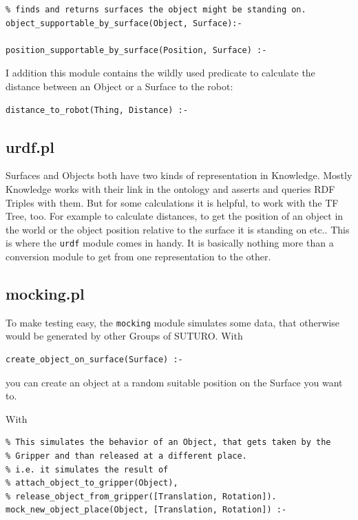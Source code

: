 \documentclass[main.tex]{subfiles}
\begin{document}
\begin{lstlisting}
% finds and returns surfaces the object might be standing on.
object_supportable_by_surface(Object, Surface):-

position_supportable_by_surface(Position, Surface) :-
\end{lstlisting}

I addition this module contains the wildly used predicate to calculate the distance between an Object or a Surface to the robot:

\begin{lstlisting}
distance_to_robot(Thing, Distance) :-
\end{lstlisting}

\subsection{urdf.pl}

Surfaces and Objects both have two kinds of representation in Knowledge. Mostly Knowledge works with their link in the ontology and asserts and queries RDF Triples with them. But for some calculations it is helpful, to work with the TF Tree, too. For example to calculate distances, to get the position of an object in the world or the object position relative to the surface it is standing on etc.. This is where the \texttt{urdf} module comes in handy. It is basically nothing more than a conversion module to get from one representation to the other.

\subsection{mocking.pl}

To make testing easy, the \texttt{mocking} module simulates some data, that otherwise would be generated by other Groups of SUTURO. With

\begin{lstlisting}
create_object_on_surface(Surface) :-
\end{lstlisting}

you can create an object at a random suitable position on the Surface you want to. 

With 

\begin{lstlisting}
% This simulates the behavior of an Object, that gets taken by the 
% Gripper and than released at a different place.
% i.e. it simulates the result of
% attach_object_to_gripper(Object),
% release_object_from_gripper([Translation, Rotation]).
mock_new_object_place(Object, [Translation, Rotation]) :-
\end{lstlisting}
\end{document}
